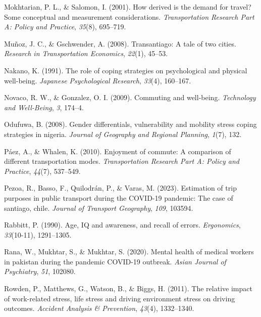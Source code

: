 \documentclass[
11pt, %
oneside, %
english, %
singlespacing, %
]{macthesis} %
\newlength{\cslhangindent}
\newenvironment{CSLReferences}[2] %
 {%
  \setlength{\parindent}{0pt}
  \ifodd #1 \everypar{\setlength{\hangindent}{\cslhangindent}}\ignorespaces\fi
  \ifnum #2 > 0
  \setlength{\parskip}{#2\baselineskip}
  \fi
 }%
 {}
\begin{document}
\begin{CSLReferences}{1}{0}
\leavevmode{}%
Mokhtarian, P. L., \& Salomon, I. (2001). How derived is the demand for travel? Some conceptual and measurement considerations. \emph{Transportation Research Part A: Policy and Practice}, \emph{35}(8), 695--719.

\leavevmode{}%
Muñoz, J. C., \& Gschwender, A. (2008). Transantiago: A tale of two cities. \emph{Research in Transportation Economics}, \emph{22}(1), 45--53.

\leavevmode{}%
Nakano, K. (1991). The role of coping strategies on psychological and physical well-being. \emph{Japanese Psychological Research}, \emph{33}(4), 160--167.

\leavevmode{}%
Novaco, R. W., \& Gonzalez, O. I. (2009). Commuting and well-being. \emph{Technology and Well-Being}, \emph{3}, 174--4.

\leavevmode{}%
Odufuwa, B. (2008). Gender differentials, vulnerability and mobility stress coping strategies in nigeria. \emph{Journal of Geography and Regional Planning}, \emph{1}(7), 132.

\leavevmode{}%
Páez, A., \& Whalen, K. (2010). Enjoyment of commute: A comparison of different transportation modes. \emph{Transportation Research Part A: Policy and Practice}, \emph{44}(7), 537--549.

\leavevmode{}%
Pezoa, R., Basso, F., Quilodrán, P., \& Varas, M. (2023). Estimation of trip purposes in public transport during the COVID-19 pandemic: The case of santiago, chile. \emph{Journal of Transport Geography}, \emph{109}, 103594.

\leavevmode{}%
Rabbitt, P. (1990). Age, IQ and awareness, and recall of errors. \emph{Ergonomics}, \emph{33}(10-11), 1291--1305.

\leavevmode{}%
Rana, W., Mukhtar, S., \& Mukhtar, S. (2020). Mental health of medical workers in pakistan during the pandemic COVID-19 outbreak. \emph{Asian Journal of Psychiatry}, \emph{51}, 102080.

\leavevmode{}%
Rowden, P., Matthews, G., Watson, B., \& Biggs, H. (2011). The relative impact of work-related stress, life stress and driving environment stress on driving outcomes. \emph{Accident Analysis \& Prevention}, \emph{43}(4), 1332--1340.


\end{CSLReferences}
\end{document}
